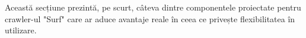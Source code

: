 Această secțiune prezintă, pe scurt, câteva dintre componentele proiectate pentru crawler-ul "Surf" care ar aduce avantaje reale în ceea ce privește flexibilitatea în utilizare.